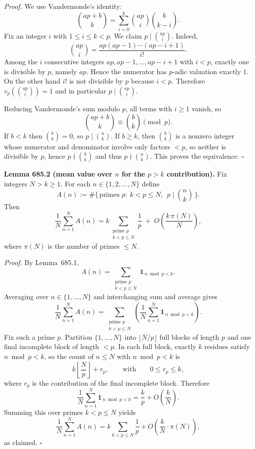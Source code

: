 \emph{Proof.}
We use Vandermonde's identity:
\[
\binom{ap+b}{k}=\sum_{i=0}^k \binom{ap}{i}\binom{b}{k-i}.
\]
Fix an integer $i$ with $1\le i\le k<p$. We claim $p\mid \binom{ap}{i}$.
Indeed,
\[
\binom{ap}{i}=\frac{ap(ap-1)\cdots (ap-i+1)}{i!}.
\]
Among the $i$ consecutive integers $ap,ap-1,\dots,ap-i+1$ with $i<p$, exactly one is divisible by $p$, namely $ap$.
Hence the numerator has $p$-adic valuation exactly $1$. On the other hand $i!$ is not divisible by $p$ because $i<p$.
Therefore $v_p\!\left(\binom{ap}{i}\right)=1$ and in particular $p\mid \binom{ap}{i}$.

Reducing Vandermonde's sum modulo $p$, all terms with $i\ge 1$ vanish, so
\[
\binom{ap+b}{k}\equiv \binom{b}{k}\pmod p.
\]
If $b<k$ then $\binom{b}{k}=0$, so $p\mid \binom{n}{k}$.
If $b\ge k$, then $\binom{b}{k}$ is a nonzero integer whose numerator and denominator involve only factors $<p$,
so neither is divisible by $p$, hence $p\nmid \binom{b}{k}$ and thus $p\nmid \binom{n}{k}$.
This proves the equivalence. \hfill$\square$

\medskip
\noindent\textbf{Lemma 685.2 (mean value over $n$ for the $p>k$ contribution).}
Fix integers $N>k\ge 1$. For each $n\in\{1,2,\dots,N\}$ define
\[
A(n):=\#\{\,\text{primes }p:\ k<p\le N,\ \ p\mid \binom{n}{k}\,\}.
\]
Then
\[
\frac1N\sum_{n=1}^N A(n)=k\sum_{\substack{\text{prime }p\\ k<p\le N}}\frac1p\;+\;O\!\left(\frac{k\,\pi(N)}{N}\right),
\]
where $\pi(N)$ is the number of primes $\le N$.

\emph{Proof.}
By Lemma~685.1,
\[
A(n)=\sum_{\substack{\text{prime }p\\ k<p\le N}} \mathbf 1_{\,n\bmod p<k}.
\]
Averaging over $n\in\{1,\dots,N\}$ and interchanging sum and average gives
\[
\frac1N\sum_{n=1}^N A(n)=\sum_{\substack{\text{prime }p\\ k<p\le N}}
\left(\frac1N\sum_{n=1}^N \mathbf 1_{\,n\bmod p<k}\right).
\]
Fix such a prime $p$. Partition $\{1,\dots,N\}$ into $\lfloor N/p\rfloor$ full blocks of length $p$
and one final incomplete block of length $<p$.
In each full block, exactly $k$ residues satisfy $n\bmod p<k$, so the count of $n\le N$ with $n\bmod p<k$ is
\[
k\left\lfloor\frac{N}{p}\right\rfloor + r_p,
\qquad\text{with}\qquad 0\le r_p\le k,
\]
where $r_p$ is the contribution of the final incomplete block.
Therefore
\[
\frac1N\sum_{n=1}^N \mathbf 1_{\,n\bmod p<k}
=\frac{k}{p}+O\!\left(\frac{k}{N}\right).
\]
Summing this over primes $k<p\le N$ yields
\[
\frac1N\sum_{n=1}^N A(n)=k\sum_{k<p\le N}\frac1p+O\!\left(\frac{k}{N}\cdot \pi(N)\right),
\]
as claimed. \hfill$\square$

